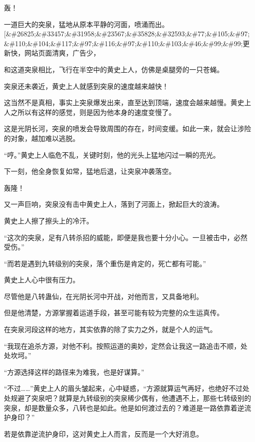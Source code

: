 
\begin{this_body}

轰！

一道巨大的突泉，猛地从原本平静的河面，喷涌而出。[\&\#26825;\&\#33457;\&\#31958;\&\#23567;\&\#35828;\&\#32593;\&\#77;\&\#105;\&\#97;\&\#110;\&\#104;\&\#117;\&\#97;\&\#116;\&\#97;\&\#110;\&\#103;\&\#46;\&\#99;\&\#99;更新快，网站页面清爽，广告少，

和这道突泉相比，飞行在半空中的黄史上人，仿佛是桌腿旁的一只苍蝇。

突泉还未袭近，黄史上人就感到突泉的速度越来越快！

这当然不是真相，事实上突泉爆发出来，直至达到顶端，速度会越来越慢。黄史上人之所以有这样的感觉，则是因为他本身的速度变慢了。

这是光阴长河，突泉的喷发会导致周围的存在，时间变缓。如此一来，就会让涉险的对象，越加难以逃脱。

“哼。”黄史上人临危不乱，关键时刻，他的光头上猛地闪过一瞬的亮光。

下一刻，他全身恢复如常，猛地后退，让突泉冲袭落空。

轰隆！

又一声巨响，突泉没有击中黄史上人，落到了河面上，掀起巨大的浪涛。

黄史上人擦了擦头上的冷汗。

“这次的突泉，足有八转杀招的威能，即便是我也要十分小心。一旦被击中，必然受伤。”

“而若是遇到九转级别的突泉，落个重伤是肯定的，死亡都有可能。”

黄史上人心中很有压力。

尽管他是八转蛊仙，在光阴长河中开战，对他而言，又具备地利。

但是他清楚，方源掌握着运道手段，甚至可能有较为完整的众生运真传。

在突泉河段这样的地方，其实依靠的除了实力之外，就是个人的运气。

“我现在追杀方源，对他不利。按照运道的奥妙，定然会让我这一路追击不顺，处处坎坷。”

“方源选择这样的路径来为难我，也是好谋算。”

“不过……”黄史上人的眉头皱起来，心中疑惑，“方源就算运气再好，也绝好不过处处规避了突泉吧？就算是九转级别的突泉稀少偶有，他遭遇不上，那些七转级别的突泉，却是数量众多，八转也是如此。他是如何渡过去的？难道是一路依靠着逆流护身印？”

若是依靠逆流护身印，这对黄史上人而言，反而是一个大好消息。


\end{this_body}

